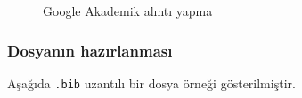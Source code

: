 \documentclass[
  letterpaper,
  DIV=11,
  numbers=noendperiod]{scrreprt}
\begin{document}
\begin{figure}
\begin{minipage}[t]{0.33\linewidth}
{{}

}

\end{minipage}%
%
\begin{minipage}[t]{0.33\linewidth}

{\centering 


}

\end{minipage}%

\caption{\label{fig-google}Google Akademik alıntı yapma}

\end{figure}

\hypertarget{dosyanux131n-hazux131rlanmasux131}{%
\subsubsection{Dosyanın
hazırlanması}\label{dosyanux131n-hazux131rlanmasux131}}

Aşağıda \texttt{.bib} uzantılı bir dosya örneği gösterilmiştir.
\end{document}
